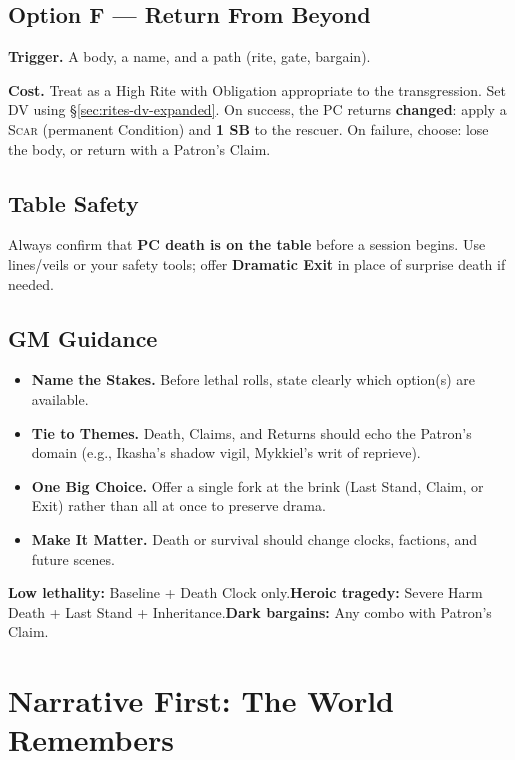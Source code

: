 \subsection*{Option F — Return From Beyond}\label{subsec:return}
\textbf{Trigger.} A body, a name, and a path (rite, gate, bargain).\par
\textbf{Cost.} Treat as a High Rite with Obligation appropriate to the transgression. Set DV using \S\ref{sec:rites-dv-expanded}. On success, the PC returns \textbf{changed}: apply a \textsc{Scar} (permanent Condition) and \textbf{1 SB} to the rescuer. On failure, choose: lose the body, or return with a Patron’s Claim.

\subsection*{Table Safety}\label{subsec:death-safety}
Always confirm that \textbf{PC death is on the table} before a session begins. Use lines/veils or your safety tools; offer \textbf{Dramatic Exit} in place of surprise death if needed.

\subsection*{GM Guidance}\label{subsec:death-gm}
\begin{itemize}
\item \textbf{Name the Stakes.} Before lethal rolls, state clearly which option(s) are available.
\item \textbf{Tie to Themes.} Death, Claims, and Returns should echo the Patron’s domain (e.g., Ikasha’s shadow vigil, Mykkiel’s writ of reprieve).
\item \textbf{One Big Choice.} Offer a single fork at the brink (Last Stand, Claim, or Exit) rather than all at once to preserve drama.
\item \textbf{Make It Matter.} Death or survival should change clocks, factions, and future scenes.
\end{itemize}

\begin{tcolorbox}[title={Quick Picks},colback=gray!5,colframe=black]
\small \textbf{Low lethality:} Baseline + Death Clock only.\quad \textbf{Heroic tragedy:} Severe Harm Death + Last Stand + Inheritance.\quad \textbf{Dark bargains:} Any combo with Patron’s Claim.\end{tcolorbox}

\section*{Narrative First: The World Remembers}

